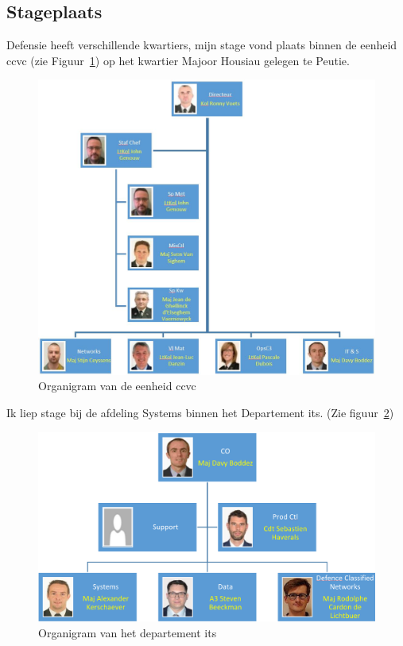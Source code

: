 \subsection{Stageplaats}

Defensie heeft verschillende \glspl{kwartier}, mijn stage vond plaats binnen de \gls{eenheid} \gls{ccvc} (zie Figuur~\ref{fig:organigram-ccvc}) op het \gls{kwartier} Majoor Housiau gelegen te Peutie.

\begin{figure}
    \includegraphics[width=\textwidth]{img/organigram-ccvc.png}
    \caption{\label{fig:organigram-ccvc}Organigram van de \gls{eenheid} \gls{ccvc}~\autocite{Defensie2022a}}
\end{figure}

Ik liep stage bij de afdeling Systems binnen het Departement \gls{its}. (Zie figuur~\ref{fig:organigram-its})

\begin{figure}
    \includegraphics[width=\textwidth]{img/organigram-its.png}
    \caption{\label{fig:organigram-its}Organigram van het departement \gls{its}~\autocite{Defensie2022a}}
\end{figure}

